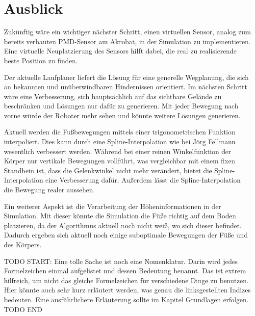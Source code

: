 \chapter{Ausblick}
\label{kap8}

Zukünftig wäre ein wichtiger nächster Schritt, einen virtuellen Sensor, analog zum bereits verbauten PMD-Sensor am Akrobat, in der Simulation zu implementieren. Eine virtuelle Neuplatzierung des Sensors hilft dabei, die real zu realisierende beste Position zu finden. 

Der aktuelle Laufplaner liefert die Lösung für eine generelle Wegplanung, die sich an bekannten und unüberwindbaren Hindernissen orientiert. Im nächsten Schritt wäre eine Verbesserung, sich hauptsächlich auf das sichtbare Gelände zu beschränken und Lösungen nur dafür zu generieren. Mit jeder Bewegung nach vorne würde der Roboter mehr sehen und könnte weitere Lösungen generieren.

Aktuell werden die Fußbewegungen mittels einer trigonometrischen Funktion interpoliert. Dies kann durch eine Spline-Interpolation wie bei Jörg Fellmann \autocite{fellmann2007} wesentlich verbessert werden. Während bei einer reinen Winkelfunktion der Körper nur vertikale Bewegungen vollführt, was vergleichbar mit einem fixen Standbein ist, dass die Gelenkwinkel nicht mehr verändert, bietet die Spline-Interpolation eine Verbesserung dafür. Außerdem lässt die Spline-Interpolation die Bewegung realer aussehen.

Ein weiterer Aspekt ist die Verarbeitung der Höheninformationen in der Simulation. Mit dieser könnte die Simulation die Füße richtig auf dem Boden platzieren, da der Algorithmus aktuell noch nicht weiß, wo sich dieser befindet. Dadurch ergeben sich aktuell noch einige suboptimale Bewegungen der Füße und des Körpers.

TODO START:
Eine tolle Sache ist noch eine Nomenklatur.
Darin wird jedes Formelzeichen einmal aufgelistet und dessen Bedeutung benannt.
Das ist extrem hilfreich, um nicht das gleiche Formelzeichen für verschiedene Dinge zu benutzen.
Hier könnte auch sehr kurz erläutert werden, was genau die linksgestellten Indizes bedeuten.
Eine ausführlichere Erläuterung sollte im Kapitel Grundlagen erfolgen.
TODO END